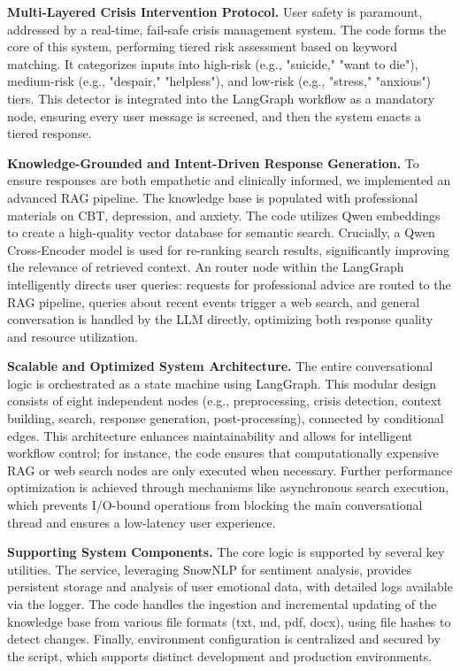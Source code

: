 \textbf{Multi-Layered Crisis Intervention Protocol.} User safety is paramount, addressed by a real-time, fail-safe crisis management system. The code forms the core of this system, performing tiered risk assessment based on keyword matching. It categorizes inputs into high-risk (e.g., "suicide," "want to die"), medium-risk (e.g., "despair," "helpless"), and low-risk (e.g., "stress," "anxious") tiers. This detector is integrated into the LangGraph workflow as a mandatory node, ensuring every user message is screened, and then the system enacts a tiered response.

\textbf{Knowledge-Grounded and Intent-Driven Response Generation.} To ensure responses are both empathetic and clinically informed, we implemented an advanced RAG pipeline. The knowledge base is populated with professional materials on CBT, depression, and anxiety. The code utilizes Qwen embeddings to create a high-quality vector database for semantic search. Crucially, a Qwen Cross-Encoder model is used for re-ranking search results, significantly improving the relevance of retrieved context. An router node within the LangGraph intelligently directs user queries: requests for professional advice are routed to the RAG pipeline, queries about recent events trigger a web search, and general conversation is handled by the LLM directly, optimizing both response quality and resource utilization.

\textbf{Scalable and Optimized System Architecture.} The entire conversational logic is orchestrated as a state machine using LangGraph. This modular design consists of eight independent nodes (e.g., preprocessing, crisis detection, context building, search, response generation, post-processing), connected by conditional edges. This architecture enhances maintainability and allows for intelligent workflow control; for instance, the code ensures that computationally expensive RAG or web search nodes are only executed when necessary. Further performance optimization is achieved through mechanisms like asynchronous search execution, which prevents I/O-bound operations from blocking the main conversational thread and ensures a low-latency user experience.

\textbf{Supporting System Components.} The core logic is supported by several key utilities. The service, leveraging SnowNLP for sentiment analysis, provides persistent storage and analysis of user emotional data, with detailed logs available via the logger. The code handles the ingestion and incremental updating of the knowledge base from various file formats (txt, md, pdf, docx), using file hashes to detect changes. Finally, environment configuration is centralized and secured by the script, which supports distinct development and production environments.